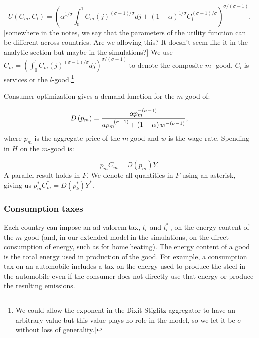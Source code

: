 \documentclass[notitlepage,12pt]{article}
\begin{document}
\begin{equation}
U\left( C_{m},C_{l}\right) =\left( \alpha ^{1/\sigma
}\int_{0}^{1}C_{m}(j)^{\left( \sigma -1\right) /\sigma }dj+\left( 1-\alpha
\right) ^{1/\sigma }C_{l}^{\left( \sigma -1\right) /\sigma }\right) ^{\sigma
/\left( \sigma -1\right) }.  \label{Utility}
\end{equation}%
[somewhere in the notes, we say that the parameters of the utility function
can be different across countries. Are we allowing this? It doesn't seem
like it in the analytic section but maybe in the simulations?] We use $%
C_{m}=\left( \int_{0}^{1}C_{m}(j)^{\left( \sigma -1\right) /\sigma
}dj\right) ^{\sigma /\left( \sigma -1\right) }$ to denote the composite $m$%
-good. $C_{l}$ is services or the $l$-good.\footnote{%
We could allow the exponent in the Dixit Stiglitz aggregator to have an
arbitrary value but this value plays no role in the model, so we let it be $%
\sigma $ without loss of generality.]}

Consumer optimization gives a demand function for the $m$-good of:

\begin{equation*}
D\left( p_{m}\right) =\frac{\alpha p_{m}^{-\left( \sigma -1\right) }}{%
ap_{m}^{-\left( \sigma -1\right) }+\left( 1-\alpha \right) w^{-\left( \sigma
-1\right) }},
\end{equation*}%
where $p_{m}$ is the aggregate price of the $m$-good and $w$ is the wage
rate. Spending in $H$ on the $m$-good is:

\begin{equation*}
p_{m}C_{m}=D\left( p_{m}\right) Y.
\end{equation*}%
A parallel result holds in $F$. We denote all quantities in $F$ using an
asterisk, giving us $p_{m}^{\ast }C_{m}^{\ast }=D\left( p_{k}^{\ast }\right)
Y^{\ast }$.

\subsubsection{Consumption taxes}

Each country can impose an ad valorem tax, $t_{c}$ and $t_{c}^{\ast }\,$, on
the energy content of the $m$-good (and, in our extended model in the
simulations, on the direct consumption of energy, such as for home heating).
The energy content of a good is the total energy used in production of the
good. For example, a consumption tax on an automobile includes a tax on the
energy used to produce the steel in the automobile even if the consumer does
not directly use that energy or produce the resulting emissions. 
\end{document}
